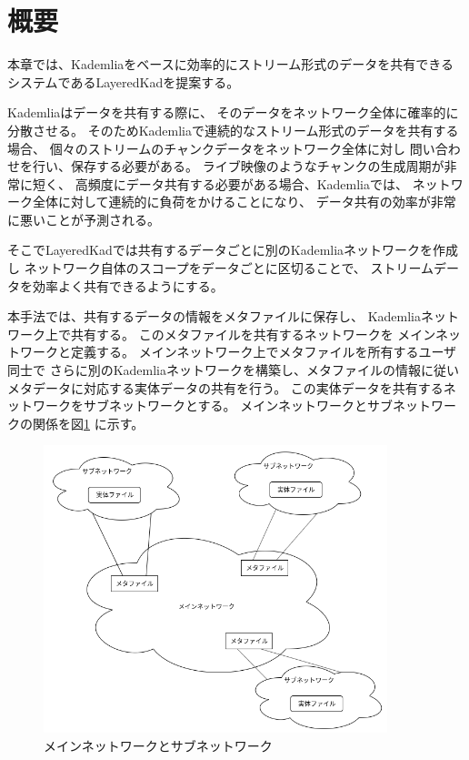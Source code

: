 \documentclass[sotsuron]{jcsie}
\begin{document}
\section{概要}
本章では、Kademliaをベースに効率的にストリーム形式のデータを共有できる
システムであるLayeredKadを提案する。

Kademliaはデータを共有する際に、
そのデータをネットワーク全体に確率的に分散させる。
そのためKademliaで連続的なストリーム形式のデータを共有する場合、
個々のストリームのチャンクデータをネットワーク全体に対し
問い合わせを行い、保存する必要がある。
ライブ映像のようなチャンクの生成周期が非常に短く、
高頻度にデータ共有する必要がある場合、Kademliaでは、
ネットワーク全体に対して連続的に負荷をかけることになり、
データ共有の効率が非常に悪いことが予測される。

そこでLayeredKadでは共有するデータごとに別のKademliaネットワークを作成し
ネットワーク自体のスコープをデータごとに区切ることで、
ストリームデータを効率よく共有できるようにする。

本手法では、共有するデータの情報をメタファイルに保存し、
Kademliaネットワーク上で共有する。
このメタファイルを共有するネットワークを
メインネットワークと定義する。
メインネットワーク上でメタファイルを所有するユーザ同士で
さらに別のKademliaネットワークを構築し、メタファイルの情報に従い
メタデータに対応する実体データの共有を行う。
この実体データを共有するネットワークをサブネットワークとする。
メインネットワークとサブネットワークの関係を図\ref{fig:image}
に示す。

\begin{figure}[H]
	\centering
	\includegraphics[width=10cm]{./assets/image/image.png}
	\caption{メインネットワークとサブネットワーク}
	\label{fig:image}
\end{figure}
\end{document}
